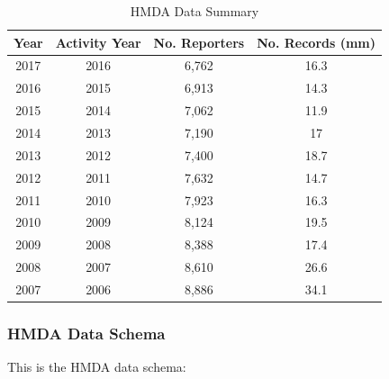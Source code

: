 \documentclass[conference,compsoc]{IEEEtran}
\begin{document}
\begin{table}[h!]
\centering
\begin{tabular}{|c|c|c|c|}
\hline
\textbf{Year} & \textbf{Activity Year} & \textbf{No. Reporters} & \textbf{No. Records  (mm)} \\ \hline
2017           & 2016               & 6,762                      & 16.3                                    \\ \hline
2016           & 2015               & 6,913                      & 14.3                                    \\ \hline
2015           & 2014               & 7,062                      & 11.9                                    \\ \hline
2014           & 2013               & 7,190                      & 17                                      \\ \hline
2013           & 2012               & 7,400                      & 18.7                                    \\ \hline
2012           & 2011               & 7,632                      & 14.7                                    \\ \hline
2011           & 2010               & 7,923                      & 16.3                                    \\ \hline
2010           & 2009               & 8,124                      & 19.5                                    \\ \hline
2009           & 2008               & 8,388                      & 17.4                                    \\ \hline
2008           & 2007               & 8,610                      & 26.6                                    \\ \hline
2007           & 2006               & 8,886                      & 34.1                                   \\ \hline
\end{tabular}
\caption{HMDA Data Summary}
\end{table}

\subsubsection{HMDA Data Schema}

\vspace{2mm}


This is the HMDA data schema: 
\end{document}
